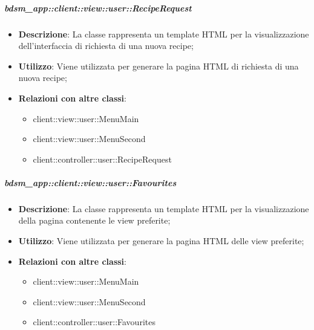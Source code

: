 		\subparagraph{bdsm\_app::client::view::user::RecipeRequest} %
		\label{subp:bdsm_app_client_view_user_reciperequest}
			\begin{itemize}
				\item \textbf{Descrizione}: La classe rappresenta un template HTML per la visualizzazione dell'interfaccia di richiesta di una nuova recipe;
				\item \textbf{Utilizzo}: Viene utilizzata per generare la pagina HTML di richiesta di una nuova recipe;
				\item \textbf{Relazioni con altre classi}: 		
					\begin{itemize}
						\item client::view::user::MenuMain
						\item client::view::user::MenuSecond
						\item client::controller::user::RecipeRequest
					\end{itemize}
			\end{itemize}

		\subparagraph{bdsm\_app::client::view::user::Favourites} %
		\label{subp:bdsm_app_client_view_user_favourites}
			\begin{itemize}
				\item \textbf{Descrizione}: La classe rappresenta un template HTML per la visualizzazione della pagina contenente le view preferite;
				\item \textbf{Utilizzo}: Viene utilizzata per generare la pagina HTML delle view preferite;
				\item \textbf{Relazioni con altre classi}: 		
					\begin{itemize}
						\item client::view::user::MenuMain
						\item client::view::user::MenuSecond
						\item client::controller::user::Favourites					
					\end{itemize}
			\end{itemize}

